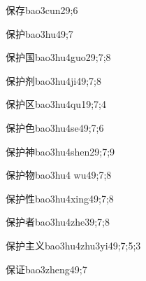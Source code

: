 \begin{verbete}{保存}{bao3cun2}{9;6}
\end{verbete}

\begin{verbete}{保护}{bao3hu4}{9;7}
\end{verbete}

\begin{verbete}{保护国}{bao3hu4guo2}{9;7;8}
\end{verbete}

\begin{verbete}{保护剂}{bao3hu4ji4}{9;7;8}
\end{verbete}

\begin{verbete}{保护区}{bao3hu4qu1}{9;7;4}
\end{verbete}

\begin{verbete}{保护色}{bao3hu4se4}{9;7;6}
\end{verbete}

\begin{verbete}{保护神}{bao3hu4shen2}{9;7;9}
\end{verbete}

\begin{verbete}{保护物}{bao3hu4 wu4}{9;7;8}
\end{verbete}

\begin{verbete}{保护性}{bao3hu4xing4}{9;7;8}
\end{verbete}

\begin{verbete}{保护者}{bao3hu4zhe3}{9;7;8}
\end{verbete}

\begin{verbete}{保护主义}{bao3hu4zhu3yi4}{9;7;5;3}
\end{verbete}

\begin{verbete}{保证}{bao3zheng4}{9;7}
\end{verbete}


